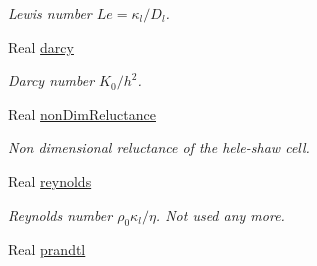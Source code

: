 \begin{DoxyCompactItemize}
\begin{DoxyCompactList}\small\item\em Lewis number $ Le = \kappa_l/D_l $. \end{DoxyCompactList}\item 
Real \hyperlink{class_mushy_layer_params_a1cc8074618d57c994ce1771cba4a973c}{darcy}
\begin{DoxyCompactList}\small\item\em Darcy number $ K_0/h^2 $. \end{DoxyCompactList}\item 
Real \hyperlink{class_mushy_layer_params_a157dde93ce7d9c83740fb9fc7fc0aadd}{non\-Dim\-Reluctance}
\begin{DoxyCompactList}\small\item\em Non dimensional reluctance of the hele-\/shaw cell. \end{DoxyCompactList}\item 
\hypertarget{class_mushy_layer_params_a6d4d8af975cb229d66da7b66b84de8e1}{Real \hyperlink{class_mushy_layer_params_a6d4d8af975cb229d66da7b66b84de8e1}{reynolds}}\label{class_mushy_layer_params_a6d4d8af975cb229d66da7b66b84de8e1}

\begin{DoxyCompactList}\small\item\em Reynolds number $ \rho_0 \kappa_l / \eta $. Not used any more. \end{DoxyCompactList}\item 
\hypertarget{class_mushy_layer_params_a5b15d882a9c331fd9e63873e7bf44b80}{Real \hyperlink{class_mushy_layer_params_a5b15d882a9c331fd9e63873e7bf44b80}{prandtl}}\label{class_mushy_layer_params_a5b15d882a9c331fd9e63873e7bf44b80}


\end{DoxyCompactItemize}

